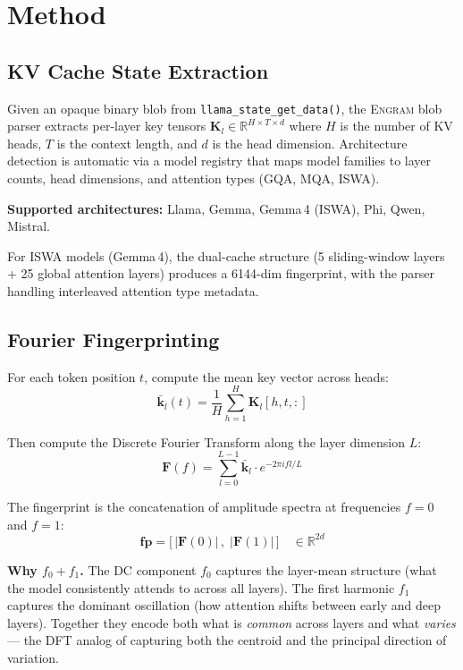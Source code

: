 \documentclass[11pt,twocolumn]{article}
\newcommand{\engram}{\textsc{Engram}}
\begin{document}
\section{Method}
\label{sec:method}

\subsection{KV Cache State Extraction}
\label{sec:extraction}

Given an opaque binary blob from \texttt{llama\_state\_get\_data()}, the
\engram{} blob parser extracts per-layer key tensors
$\mathbf{K}_l \in \mathbb{R}^{H \times T \times d}$ where $H$ is the
number of KV heads, $T$ is the context length, and $d$ is the head
dimension. Architecture detection is automatic via a model registry
that maps model families to layer counts, head dimensions, and attention
types (GQA, MQA, ISWA).

\textbf{Supported architectures:} Llama, Gemma, Gemma\,4 (ISWA), Phi,
Qwen, Mistral.

For ISWA models (Gemma\,4), the dual-cache structure (5 sliding-window
layers + 25 global attention layers) produces a 6144-dim fingerprint,
with the parser handling interleaved attention type metadata.

\subsection{Fourier Fingerprinting}
\label{sec:fourier}

For each token position $t$, compute the mean key vector across heads:
\begin{equation}
  \bar{\mathbf{k}}_l(t) = \frac{1}{H}\sum_{h=1}^{H}\mathbf{K}_l[h,t,:]
\end{equation}

Then compute the Discrete Fourier Transform along the layer dimension $L$:
\begin{equation}
  \mathbf{F}(f) = \sum_{l=0}^{L-1} \bar{\mathbf{k}}_l \cdot e^{-2\pi i f l / L}
\end{equation}

The fingerprint is the concatenation of amplitude spectra at frequencies
$f{=}0$ and $f{=}1$:
\begin{equation}
  \mathbf{fp} = \big[\,|\mathbf{F}(0)|\,,\;|\mathbf{F}(1)|\,\big]
  \quad\in\mathbb{R}^{2d}
  \label{eq:fingerprint}
\end{equation}

\textbf{Why $f_0{+}f_1$.} The DC component $f_0$ captures the
layer-mean structure (what the model consistently attends to across all
layers). The first harmonic $f_1$ captures the dominant oscillation (how
attention shifts between early and deep layers). Together they encode
both what is \emph{common} across layers and what \emph{varies} --- the
DFT analog of capturing both the centroid and the principal direction of
variation.
\end{document}
